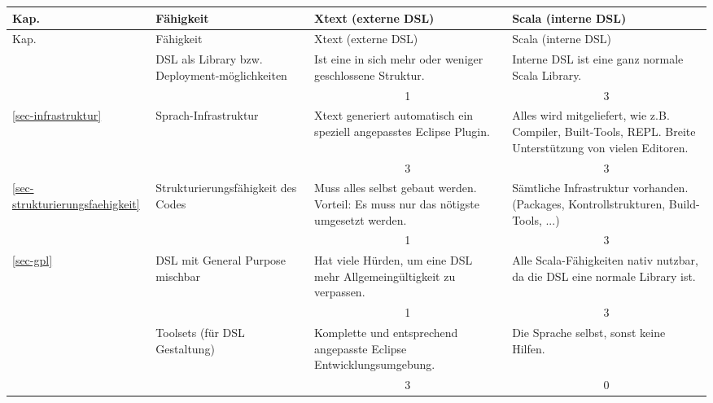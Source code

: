 \begin{landscape}
\begin{longtable}{|p{0.8cm}|p{4.4cm}|p{6.4cm}|p{6.4cm}|}

  \hline
  Kap. & Fähigkeit & Xtext (externe DSL) & Scala (interne DSL) \\ \hline \hline
  \endfirsthead

  \hline
  Kap. & Fähigkeit & Xtext (externe DSL) & Scala (interne DSL) \\ \hline
  \endhead

  & DSL als Library bzw. Deployment-möglichkeiten
  & Ist eine in sich mehr oder weniger geschlossene Struktur.
  & Interne DSL ist eine ganz normale Scala Library.
  \\
  \cline{3-4}
  & & \multicolumn{1}{c|}{ 1 } & \multicolumn{1}{c|}{ 3 } \\ \hline

  \ref{sec-infrastruktur}
  & Sprach-Infrastruktur
  & Xtext generiert automatisch ein speziell angepasstes Eclipse Plugin.
  & Alles wird mitgeliefert, wie z.B. Compiler, Built-Tools, REPL.
    Breite Unterstützung von vielen Editoren.
  \\
  \cline{3-4}
  & & \multicolumn{1}{c|}{ 3 } & \multicolumn{1}{c|}{ 3 } \\ \hline

  \ref{sec-strukturierungsfaehigkeit}
  & Strukturierungsfähigkeit des Codes
  & Muss alles selbst gebaut werden. Vorteil: Es muss nur das nötigste
    umgesetzt werden.
  & Sämtliche Infrastruktur vorhanden. (Packages, Kontrollstrukturen,
    Build-Tools, ...)
  \\
  \cline{3-4}
  & & \multicolumn{1}{c|}{ 1 } & \multicolumn{1}{c|}{ 3 } \\ \hline

  \ref{sec-gpl}
  & DSL mit General Purpose mischbar
  & Hat viele Hürden, um eine DSL mehr Allgemeingültigkeit zu verpassen.
  & Alle Scala-Fähigkeiten nativ nutzbar, da die DSL eine normale Library ist.
  \\
  \cline{3-4}
  & & \multicolumn{1}{c|}{ 1 } & \multicolumn{1}{c|}{ 3 } \\ \hline

  & Toolsets (für DSL Gestaltung)
  & Komplette und entsprechend angepasste Eclipse Entwicklungsumgebung.
  & Die Sprache selbst, sonst keine Hilfen.
  \\
  \cline{3-4}
  & & \multicolumn{1}{c|}{ 3 } & \multicolumn{1}{c|}{ 0 } \\ \hline


\end{longtable}
\end{landscape}
